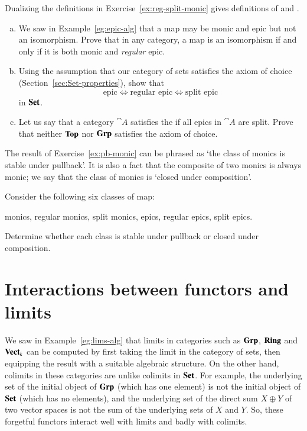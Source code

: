 \begin{question}
Dualizing the definitions in Exercise~\ref{ex:reg-split-monic} gives
definitions of %
%
%
and .
%
\begin{enumerate}[(b)]
\item
We saw in Example~\ref{eg:epic-alg} that a map may be monic and epic but
not an isomorphism.  Prove that in any category, a map is an isomorphism if
and only if it is both monic and \emph{regular} epic.

\item
Using the assumption that our category of sets satisfies the axiom of
choice (Section~\ref{sec:Set-properties}), show that
\[
\text{epic} \iff \text{regular epic} \iff \text{split epic}
\]
in $\mathbf{Set}$.

\item
Let us say that a category $\cat{A}$ satisfies the  if all epics in $\cat{A}$ are split.  Prove that neither $\mathbf{Top}$
nor $\mathbf{Grp}$ satisfies the axiom of choice.
\end{enumerate}
\end{question}


\begin{question}
The result of Exercise~\ref{ex:pb-monic} can be phrased as `the class of
monics%
%
%
%
is stable under pullback'.  It is also a fact that the composite%
%
%
of two monics is always monic; we say that the class of monics is `closed
under composition'.

Consider the following six classes of map:
%
\begin{displaytext}
monics, regular monics, split monics,
epics, regular epics, split epics.
\end{displaytext}
%
Determine whether each class is stable under pullback or closed under
composition.
\end{question}



\section{Interactions between functors and limits}
\label{sec:lims-ftrs}


We saw in Example~\ref{eg:lims-alg} that limits in categories such as
$\mathbf{Grp}$, $\mathbf{Ring}$ and $\mathbf{Vect}_k$ can be computed by first taking the limit in
the category of sets, then equipping the result with a suitable algebraic
structure.  On the other hand, colimits in these categories are unlike
colimits in $\mathbf{Set}$.  For example, the underlying set of the initial object
of $\mathbf{Grp}$ (which has one element) is not the initial object of $\mathbf{Set}$
(which has no elements), and the underlying set of the direct sum $X \oplus
Y$ of two vector spaces is not the sum of the underlying sets of $X$ and
$Y$.  So, these forgetful functors interact well with limits and badly with
colimits.

